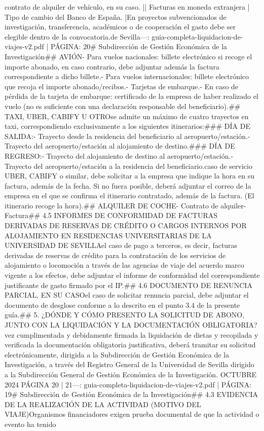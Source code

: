 \documentclass{article}
\begin{document}
\begin{itemize}
{contrato de alquiler de vehículo, en su caso. |\n| Facturas en moneda extranjera | Tipo de cambio del Banco de España.                                                    |\n\n* En proyectos subvencionados de investigación, transferencia, académicos o de cooperación el gasto debe ser elegible dentro de la convocatoria.\n\nGerencia\nUniversidad de Sevilla\n\n---\n\nFUENTE: guia-completa-liquidacion-de-viajes-v2.pdf | PÁGINA: 20\n# Subdirección de Gestión Económica de la Investigación\n\n## AVIÓN\n\n- Para vuelos nacionales: billete electrónico si recoge el importe abonado, en caso contrario, debe adjuntar además la factura correspondiente a dicho billete.\n- Para vuelos internacionales: billete electrónico que recoja el importe abonado/recibos.\n- Tarjetas de embarque.\n- En caso de pérdida de la tarjeta de embarque: certificado de la empresa de haber realizado el vuelo (no es suficiente con una declaración responsable del beneficiario).\n\n## TAXI, UBER, CABIFY U OTRO\n{} se admite un máximo de cuatro trayectos en taxi, correspondiendo exclusivamente a los siguientes itinerarios:\n\n### DÍA DE SALIDA:\n- Trayecto desde la residencia del beneficiario al aeropuerto/estación.\n- Trayecto del aeropuerto/estación al alojamiento de destino.\n\n### DÍA DE REGRESO:\n- Trayecto del alojamiento de destino al aeropuerto/estación.\n- Trayecto del aeropuerto/estación a la residencia del beneficiario.\n\nEn caso de servicio UBER, CABIFY o similar, debe solicitar a la empresa que indique la hora en su factura, además de la fecha. Si no fuera posible, deberá adjuntar el correo de la empresa en el que se confirma el itinerario contratado, además de la factura. (El itinerario recoge la hora).\n\n## ALQUILER DE COCHE\n\n- Contrato de alquiler\n- Factura\n\n## 4.5 INFORMES DE CONFORMIDAD DE FACTURAS DERIVADAS DE RESERVAS DE CRÉDITO O CARGOS INTERNOS POR ALOJAMIENTO EN RESIDENCIAS UNIVERSITARIAS DE LA UNIVERSIDAD DE SEVILLA\n\nEn el caso de pago a terceros, es decir, facturas derivadas de reservas de crédito para la contratación de los servicios de alojamiento o locomoción a través de las agencias de viaje del acuerdo marco vigente a los efectos, debe adjuntar el informe de conformidad del correspondiente justificante de gasto firmado por el IP.\n\n## 4.6 DOCUMENTO DE RENUNCIA PARCIAL, EN SU CASO\n\nEn el caso de solicitar renuncia parcial, debe adjuntar el documento de desglose conforme a lo descrito en el punto 3.4 de la presente guía.\n\n## 5. ¿DÓNDE Y CÓMO PRESENTO LA SOLICITUD DE ABONO, JUNTO CON LA LIQUIDACIÓN Y LA DOCUMENTACIÓN OBLIGATORIA?\n\nUna vez cumplimentada y debidamente firmada la liquidación de dietas y recopilada y verificada la documentación obligatoria justificativa, deberá tramitar su solicitud electrónicamente, dirigida a la Subdirección de Gestión Económica de la Investigación, a través del Registro General de la Universidad de Sevilla dirigido a la Subdirección General de Gestión Económica de la Investigación.\n{} OCTUBRE 2024    PÁGINA 20 | 21\n\n---\n\nFUENTE: guia-completa-liquidacion-de-viajes-v2.pdf | PÁGINA: 19\n# Subdirección de Gestión Económica de la Investigación\n\n## 4.3 EVIDENCIA DE LA REALIZACIÓN DE LA ACTIVIDAD (MOTIVO DEL VIAJE)\n\nLos Organismos financiadores exigen prueba documental de que la actividad o evento ha tenido }
\end{itemize}
\end{document}

